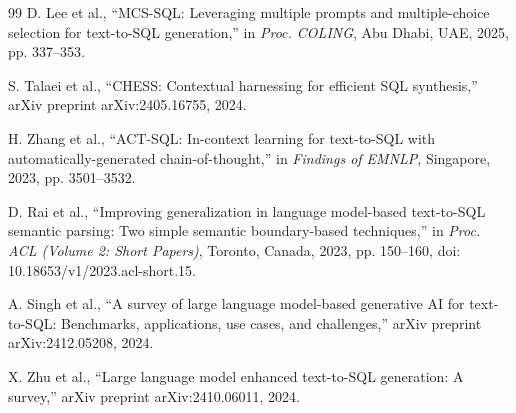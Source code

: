 \documentclass[journal]{IEEEtran}
\begin{document}
\begin{thebibliography}{99}
	D. Lee et al., ``MCS-SQL: Leveraging multiple prompts and multiple-choice selection for text-to-SQL generation,'' in \textit{Proc. COLING}, Abu Dhabi, UAE, 2025, pp. 337--353.

	S. Talaei et al., ``CHESS: Contextual harnessing for efficient SQL synthesis,'' arXiv preprint arXiv:2405.16755, 2024.

	H. Zhang et al., ``ACT-SQL: In-context learning for text-to-SQL with automatically-generated chain-of-thought,'' in \textit{Findings of EMNLP}, Singapore, 2023, pp. 3501--3532.

	D. Rai et al., ``Improving generalization in language model-based text-to-SQL semantic parsing: Two simple semantic boundary-based techniques,'' in \textit{Proc. ACL (Volume 2: Short Papers)}, Toronto, Canada, 2023, pp. 150--160, doi: 10.18653/v1/2023.acl-short.15.

	A. Singh et al., ``A survey of large language model-based generative AI for text-to-SQL: Benchmarks, applications, use cases, and challenges,'' arXiv preprint arXiv:2412.05208, 2024.

	X. Zhu et al., ``Large language model enhanced text-to-SQL generation: A survey,'' arXiv preprint arXiv:2410.06011, 2024.

\end{thebibliography}
\end{document}
